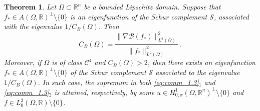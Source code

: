 \documentclass[11pt]{article}
\newtheorem{theorem}{Theorem}[section]
\theoremstyle{plain}
\theoremstyle{definition}
\numberwithin{equation}{section}
\newcommand{\R}{\mathbb{R}}
\begin{document}
\begin{theorem}\label{bogoatttheo}
Let $\Omega\subset\R^n$ be a bounded Lipschitz domain. Suppose that $f_{*} \in A(\Omega,\R)^{\perp} \setminus \{0\}$ is an eigenfunction of the Schur complement $\mathcal{S}$, associated with the eigenvalue $1/C_{B}(\Omega)$. Then
\begin{equation}\label{bogoatt}
	C_B(\Omega) = \dfrac{\| \nabla \mathcal{B}(f_{*}) \|_{L^2(\Omega)}^2}{\| f_{*} \|_{L^2(\Omega)}^2} \, .
\end{equation}
Moreover, if $\Omega$ is of class $\mathcal{C}^{4}$ and $C_{B}(\Omega) > 2$, then there exists an eigenfunction $f_{*} \in A(\Omega,\R)^{\perp} \setminus \{0\}$ of the Schur complement $\mathcal{S}$
associated to the eigenvalue $1/C_{B}(\Omega)$. In such case, the supremum
in both \eqref{eq:comm_1.3}$_1$ and \eqref{eq:comm_1.3}$_2$ is attained, respectively, by some $u\in H^1_{0,\sigma}(\Omega,\R^n)^\perp\setminus\{0\}$ and $f\in L^2_0(\Omega,\R)\setminus\{0\}$.
\end{theorem}
\noindent
\end{document}
